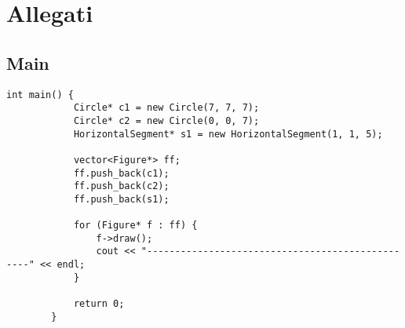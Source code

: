 \documentclass[addpoints,12pt,answers]{exam}
\begin{document}
    \section{Allegati}

    \subsection{Main}

    \begin{lstlisting}[style=mycpp]
        int main() {
            Circle* c1 = new Circle(7, 7, 7);
            Circle* c2 = new Circle(0, 0, 7);
            HorizontalSegment* s1 = new HorizontalSegment(1, 1, 5);
        
            vector<Figure*> ff;
            ff.push_back(c1);
            ff.push_back(c2);
            ff.push_back(s1);
        
            for (Figure* f : ff) {
                f->draw();
                cout << "-------------------------------------------------" << endl;
            }
        
            return 0;
        }
    \end{lstlisting}
\end{document}
